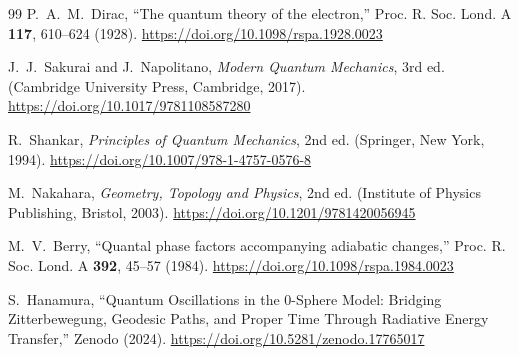 \documentclass[%
 reprint,
 amsmath,amssymb,
 aps,
 prb,
]{revtex4-2}
\numberwithin{equation}{section}
\begin{document}
\begin{thebibliography}{99}
P.~A.~M.~Dirac,
``The quantum theory of the electron,''
Proc. R. Soc. Lond. A \textbf{117}, 610--624 (1928).
\href{https://doi.org/10.1098/rspa.1928.0023}{https://doi.org/10.1098/rspa.1928.0023}

J.~J.~Sakurai and J.~Napolitano,
\textit{Modern Quantum Mechanics}, 3rd ed.
(Cambridge University Press, Cambridge, 2017).
\href{https://doi.org/10.1017/9781108587280}{https://doi.org/10.1017/9781108587280}

R.~Shankar,
\textit{Principles of Quantum Mechanics}, 2nd ed.
(Springer, New York, 1994).
\href{https://doi.org/10.1007/978-1-4757-0576-8}{https://doi.org/10.1007/978-1-4757-0576-8}

M.~Nakahara,
\textit{Geometry, Topology and Physics}, 2nd ed.
(Institute of Physics Publishing, Bristol, 2003).
\href{https://doi.org/10.1201/9781420056945}{https://doi.org/10.1201/9781420056945}

M.~V.~Berry,
``Quantal phase factors accompanying adiabatic changes,''
Proc. R. Soc. Lond. A \textbf{392}, 45--57 (1984).
\href{https://doi.org/10.1098/rspa.1984.0023}{https://doi.org/10.1098/rspa.1984.0023}

S.~Hanamura,
``Quantum Oscillations in the 0-Sphere Model: Bridging Zitterbewegung, Geodesic Paths, and Proper Time Through Radiative Energy Transfer,''
Zenodo (2024).
\href{https://doi.org/10.5281/zenodo.17765017}{https://doi.org/10.5281/zenodo.17765017}


\end{thebibliography}
\end{document}
